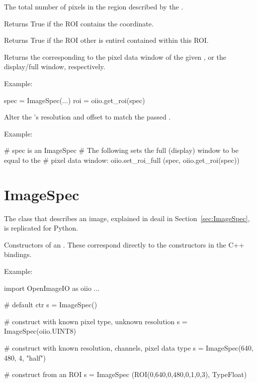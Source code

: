 The total number of pixels in the region described by the \ROI.
\apiend

\NEW %
Returns {\cf True} if the ROI contains the coordinate.
\apiend

\NEW %
Returns {\cf True} if the ROI {\cf other} is entirel contained within
this ROI.
\apiend


Returns the \ROI corresponding to the pixel data window of the given
\ImageSpec, or the display/full window, respectively.

\noindent Example:
\begin{code}
    spec = ImageSpec(...)
    roi = oiio.get_roi(spec)
\end{code}
\apiend

Alter the \ImageSpec's resolution and offset to match the passed \ROI.

\noindent Example:
\begin{code}
    # spec is an ImageSpec
    # The following sets the full (display) window to be equal to the
    # pixel data window:
    oiio.set_roi_full (spec, oiio.get_roi(spec))
\end{code}
\apiend


\section{ImageSpec}
\label{sec:pythonimagespec}

The \ImageSpec class that describes an image, explained in deail in
Section~\ref{sec:ImageSpec}, is replicated for Python.

Constructors of an \ImageSpec. These correspond directly to the constructors
in the C++ bindings.

\noindent Example:
\begin{code}
    import OpenImageIO as oiio
    ...

    # default ctr
    s = ImageSpec()

    # construct with known pixel type, unknown resolution
    s = ImageSpec(oiio.UINT8)

    # construct with known resolution, channels, pixel data type
    s = ImageSpec(640, 480, 4, "half")

    # construct from an ROI
    s = ImageSpec (ROI(0,640,0,480,0,1,0,3), TypeFloat)
\end{code}
\apiend

